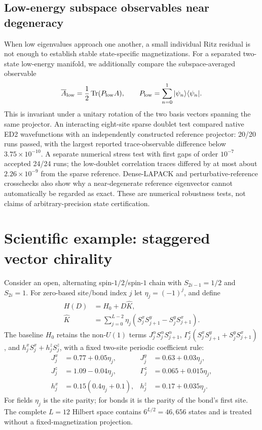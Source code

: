 \documentclass[preprint,12pt,nopreprintline]{elsarticle}
\begin{document}
\subsection{Low-energy subspace observables near degeneracy}
When low eigenvalues approach one another, a small
individual Ritz residual is not enough to establish
stable state-specific magnetizations. For a separated
two-state low-energy manifold, we additionally compare
the subspace-averaged observable
\begin{equation}
\overline A_{\rm low}=\frac12\operatorname{Tr}(P_{\rm low}A),
\qquad
P_{\rm low}=\sum_{n=0}^1 |\psi_n\rangle\langle\psi_n|.
\label{eq:projector}
\end{equation}
This is invariant under a unitary rotation of the
two basis vectors spanning the same projector.
An interacting eight-site sparse doublet test
compared native ED2 wavefunctions with an independently
constructed reference projector: 20/20 runs passed,
with the largest reported trace-observable difference
below $3.75\times10^{-10}$.
A separate numerical stress test with first gaps
of order $10^{-7}$ accepted 24/24 runs; the low-doublet
correlation traces differed by at most about
$2.26\times10^{-9}$ from the sparse reference.
Dense-LAPACK and perturbative-reference crosschecks
also show why a near-degenerate reference eigenvector
cannot automatically be regarded as exact.
These are numerical robustness tests, not claims
of arbitrary-precision state certification.

\section{Scientific example: staggered vector chirality}\label{sec:chirality}
Consider an open, alternating spin-$1/2$/spin-$1$ chain
with $S_{2i-1}=1/2$ and $S_{2i}=1$.
For zero-based site/bond index $j$ let
$\eta_j=(-1)^j$, and define
\begin{align}
H(D)&=H_0+D\hat K,\label{eq:hdm}\\
\hat K&=\sum_{j=0}^{L-2}
\eta_j(S_j^xS_{j+1}^y-S_j^yS_{j+1}^x).
\label{eq:chirality}
\end{align}
The baseline $H_0$ retains the non-$U(1)$ terms
$J_j^\alpha S_j^\alpha S_{j+1}^\alpha$,
$\Gamma^z_j(S_j^xS_{j+1}^y+S_j^yS_{j+1}^x)$,
and $h_j^x S_j^x+h_j^z S_j^z$, with a fixed
two-site periodic coefficient rule:
\begin{align}
J_j^x&=0.77+0.05\eta_j,& J_j^y&=0.63+0.03\eta_j,\nonumber\\
J_j^z&=1.09-0.04\eta_j,& \Gamma_j^z&=0.065+0.015\eta_j,\nonumber\\
h_j^x&=0.15(0.4\eta_j+0.1),&
h_j^z&=0.17+0.035\eta_j.
\label{eq:coefficients}
\end{align}
For fields $\eta_j$ is the site parity; for bonds
it is the parity of the bond's first site.
The complete $L=12$ Hilbert space contains
$6^{L/2}=46{,}656$ states and is treated without
a fixed-magnetization projection.
\end{document}
